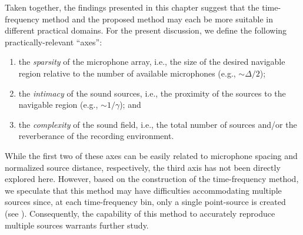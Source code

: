 Taken together, the findings presented in this chapter suggest that the time-frequency method and the proposed method may each be more suitable in different practical domains.
For the present discussion, we define the following practically-relevant ``axes'':
\begin{enumerate}
\item the \textit{sparsity} of the microphone array, i.e., the size of the desired navigable region relative to the number of available microphones (e.g., $\sim\Delta/2$);
\item the \textit{intimacy} of the sound sources, i.e., the proximity of the sources to the navigable region (e.g., $\sim1/\gamma$); and
\item the \textit{complexity} of the sound field, i.e., the total number of sources and/or the reverberance of the recording environment.
\end{enumerate}
While the first two of these axes can be easily related to microphone spacing and normalized source distance, respectively, the third axis has not been directly explored here.
However, based on the construction of the time-frequency method, we speculate that this method may have difficulties accommodating multiple sources since, at each time-frequency bin, only a single point-source is created (see ).
Consequently, the capability of this method to accurately reproduce multiple sources warrants further study.


